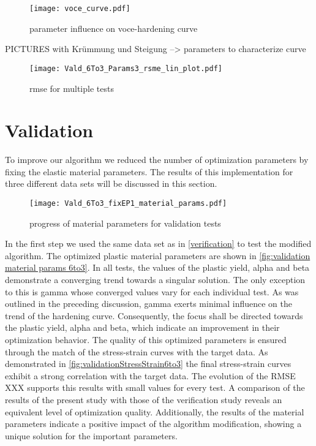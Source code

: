\begin{figure}[H]
    \centering
    \texttt{[image: voce\_curve.pdf]}
    \caption{parameter influence on voce-hardening curve}
    \label{fig:Parameter influence on VOCE-hardening curve}
\end{figure}
PICTURES with Krümmung und Steigung --> parameters to characterize curve

\begin{figure}[H]
    \centering
    \texttt{[image: Vald\_6To3\_Params3\_rsme\_lin\_plot.pdf]}
    \caption{rmse for multiple tests}
    \label{fig:rmse progress}
\end{figure}


\section{Validation}\label{sec: validation}
To improve our algorithm we reduced the number of optimization parameters by fixing the elastic material parameters. The results of this implementation for three different data sets will be discussed in this section.

\begin{figure}[H]
    \centering
    \texttt{[image: Vald\_6To3\_fixEP1\_material\_params.pdf]}
    \caption{progress of material parameters for validation tests}
    \label{fig:validation material params 6to3}
\end{figure}

In the first step we used the same data set as in \autoref{verification} to test the modified algorithm. The optimized plastic material parameters are shown in \autoref{fig:validation material params 6to3}.  In all tests, the values of the plastic yield, alpha and beta demonstrate a converging trend towards a singular solution. The only exception to this is gamma whose converged values vary for each individual test. As was outlined in the preceding discussion, gamma exerts minimal influence on the trend of the hardening curve. Consequently, the focus shall be directed towards the plastic yield, alpha and beta, which indicate an improvement in their optimization behavior.
The quality of this optimized parameters is ensured through the match of the stress-strain curves with the target data. As demonstrated in \autoref{fig:validationStressStrain6to3} the final stress-strain curves exhibit a strong correlation with the target data. The evolution of the RMSE XXX supports this results with small values for every test. A comparison of the results of the present study with those of the verification study reveals an equivalent level of optimization quality. Additionally, the results of the material parameters indicate a positive impact of the algorithm modification, showing a unique solution for the important parameters. 
    

